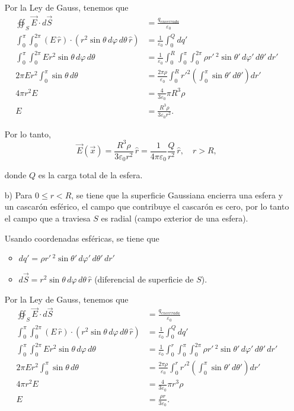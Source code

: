 \begin{ejemplo}
\begin{itemize}
Por la Ley de Gauss, tenemos que
\begingroup
\allowdisplaybreaks
\begin{align*}
    \oiint_S \vec{E} \cdot d\vec{S} &= \frac{q_{encerrada}}{\varepsilon_0} \\
    \int_0^{\pi} \int_0^{2\pi} (E \,\hat{r}) \cdot (r^2 \sin \theta\, d\varphi \,d\theta \,\hat{r}) &= \frac{1}{\varepsilon_0} \int_0^Q dq' \\
    \int_0^{\pi} \int_0^{2\pi} E   r^2 \sin \theta \, d\varphi \,d\theta &= \frac{1}{\varepsilon_0} \int_0^R\int_0^{\pi}\int_0^{2\pi} \rho r'\,^2  \sin \theta'\, d\varphi'\, d\theta'\, dr' \\
    2\pi E r^2 \int_0^{\pi} \sin \theta \,d\theta &= \frac{2\pi \rho}{\varepsilon_0} \int_0^R r'^2 \left( \int_0^\pi \sin \theta'\, d\theta' \right)  dr' \\ 
    4\pi r^2 E &= \frac{4}{3\varepsilon_0} \pi R^3 \rho \\
    E &= \frac{R^3 \rho}{3 \varepsilon_0 r^2}.
\end{align*}
\endgroup

Por lo tanto, 
$$\vec{E}(\vec{x}) = \frac{R^3 \rho}{3 \varepsilon_0 r^2} \,\hat{r} = \frac{1}{4\pi \varepsilon_0} \frac{Q}{r^2}\, \hat{r}, \quad r > R,$$ 

donde $Q$ es la carga total de la esfera.

\item[b)] Para $0 \leq r < R$, se tiene que la superficie Gaussiana encierra una esfera y un cascarón esférico, el campo que contribuye el cascarón es cero, por lo tanto el campo que a traviesa $S$ es radial (campo exterior de una esfera).

Usando coordenadas esféricas, se tiene que

\begin{itemize}
\item $dq' = \rho r'\,^2 \sin \theta'\, d\varphi'\, d\theta'\, dr'$ 

\item $d\vec{S} = r^2 \sin \theta\, d\varphi\, d\theta\, \hat{r}$ (diferencial de superficie de $S$).
\end{itemize}

Por la Ley de Gauss, tenemos que
\begin{align*}
    \oiint_S \vec{E} \cdot d\vec{S} &= \frac{q_{encerrada}}{\varepsilon_0} \\
    \int_0^{\pi} \int_0^{2\pi} (E \,\hat{r}) \cdot (r^2 \sin \theta\, d\varphi \,d\theta \,\hat{r}) &= \frac{1}{\varepsilon_0} \int_0^Q dq' \\
    \int_0^{\pi} \int_0^{2\pi} E   r^2 \sin \theta \, d\varphi \,d\theta &= \frac{1}{\varepsilon_0} \int_0^r\int_0^{\pi}\int_0^{2\pi} \rho r'\,^2  \sin \theta'\, d\varphi'\, d\theta'\, dr' \\
    2\pi E r^2 \int_0^{\pi} \sin \theta \,d\theta &= \frac{2\pi \rho}{\varepsilon_0} \int_0^r r'^2 \left( \int_0^\pi \sin \theta'\, d\theta' \right)  dr' \\ 
    4\pi r^2 E &= \frac{4}{3\varepsilon_0} \pi r^3 \rho \\
    E &= \frac{\rho r}{3 \varepsilon_0}.
\end{align*}


\end{itemize}
\end{ejemplo}

